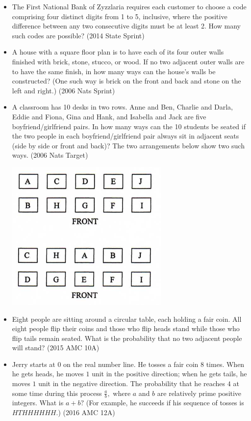 \documentclass{article}
\begin{document}
\begin{itemize}
\item The First National Bank of Zyzzlaria requires each customer to choose a code comprising four distinct digits from 1 to 5, inclusive, where the positive difference between any two consecutive digits must be at least 2. How many such codes are possible? (2014 State Sprint)

\item A house with a square floor plan is to have each of its four outer walls finished with brick, stone, stucco, or wood. If no two adjacent outer walls are to have the same finish, in how many ways can the house's walls be constructed? (One such way is brick on the front and back and stone on the left and right.) (2006 Nats Sprint)

\item A classroom has 10 desks in two rows. Anne and Ben, Charlie and Darla, Eddie and Fiona, Gina and Hank, and Isabella and Jack are five boyfriend/girlfriend pairs. In how many ways can the 10 students be seated if the two people in each boyfriend/girlfriend pair always sit in adjacent seats (side by side or front and back)? The two arrangements below show two such ways. (2006 Nats Target)

\centerline{\includegraphics{20068.PNG}}

\item Eight people are sitting around a circular table, each holding a fair coin. All eight people flip their coins and those who flip heads stand while those who flip tails remain seated. What is the probability that no two adjacent people will stand? (2015 AMC 10A)

\item Jerry starts at $0$ on the real number line. He tosses a fair coin $8$ times. When he gets heads, he moves $1$ unit in the positive direction; when he gets tails, he moves $1$ unit in the negative direction. The probability that he reaches $4$ at some time during this process $\frac{a}{b},$ where $a$ and $b$ are relatively prime positive integers. What is $a + b?$ (For example, he succeeds if his sequence of tosses is $HTHHHHHH.$) (2016 AMC 12A)



\end{itemize}
\end{document}

